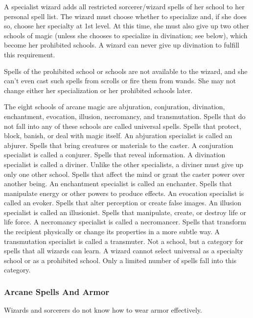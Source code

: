 \par A specialist wizard adds all restricted sorcerer/wizard spells of her school to her personal spell list.  The wizard must choose whether to specialize and, if she does so, choose her specialty at 1st level. At this time, she must also give up two other schools of magic (unless she chooses to specialize in divination; see below), which become her prohibited schools. A wizard can never give up divination to fulfill this requirement.

Spells of the prohibited school or schools are not available to the wizard, and she
can't even cast such spells from scrolls or fire them from wands. She
may not change either her specialization or her prohibited schools later.
\par The eight schools of arcane magic are abjuration, conjuration,
divination, enchantment, evocation, illusion, necromancy, and transmutation. Spells that do not fall into any of these schools are called universal spells.
 Spells that protect, block, banish, or deal with magic itself. An abjuration specialist is called an abjurer.
 Spells that bring creatures or materials to the caster. A
conjuration specialist is called a conjurer.
 Spells that reveal information. A divination specialist is
called a diviner. Unlike the other specialists, a diviner must give up only
one other school.
 Spells that affect the mind or grant the caster power over another being. An enchantment specialist is called an enchanter.
 Spells that manipulate energy or other powers to produce effects. An evocation specialist is called an evoker.
 Spells that alter perception or create false images. An illusion
specialist is called an illusionist.
 Spells that manipulate, create, or destroy life or life force.
A necromancy specialist is called a necromancer.
 Spells that transform the recipient physically or change
its properties in a more subtle way. A transmutation specialist is called a
transmuter.
 Not a school, but a category for spells that all wizards can
learn. A wizard cannot select universal as a specialty school or as a
prohibited school. Only a limited number of spells fall into this category.

\subsubsection{Arcane Spells And Armor}
Wizards and sorcerers do not know how to wear armor effectively.

